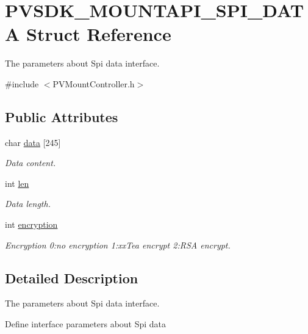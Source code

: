 \hypertarget{struct_p_v_s_d_k___m_o_u_n_t_a_p_i___s_p_i___d_a_t_a}{}\section{P\+V\+S\+D\+K\+\_\+\+M\+O\+U\+N\+T\+A\+P\+I\+\_\+\+S\+P\+I\+\_\+\+D\+A\+TA Struct Reference}
\label{struct_p_v_s_d_k___m_o_u_n_t_a_p_i___s_p_i___d_a_t_a}


The parameters about Spi data interface.  




{\ttfamily \#include $<$P\+V\+Mount\+Controller.\+h$>$}

\subsection*{Public Attributes}
\begin{DoxyCompactItemize}
\item 
char \hyperlink{struct_p_v_s_d_k___m_o_u_n_t_a_p_i___s_p_i___d_a_t_a_aaa26560d408d7804790b4ff594653f5a}{data} \mbox{[}245\mbox{]}
\begin{DoxyCompactList}\small\item\em Data content. \end{DoxyCompactList}\item 
int \hyperlink{struct_p_v_s_d_k___m_o_u_n_t_a_p_i___s_p_i___d_a_t_a_a77c84315ee6f96ea5454098fcda85e34}{len}
\begin{DoxyCompactList}\small\item\em Data length. \end{DoxyCompactList}\item 
int \hyperlink{struct_p_v_s_d_k___m_o_u_n_t_a_p_i___s_p_i___d_a_t_a_aace395c53127f591b78a5afb35ffb446}{encryption}
\begin{DoxyCompactList}\small\item\em Encryption 0\+:no encryption 1\+:xx\+Tea encrypt 2\+:R\+SA encrypt. \end{DoxyCompactList}\end{DoxyCompactItemize}


\subsection{Detailed Description}
The parameters about Spi data interface. 

Define interface parameters about Spi data 

